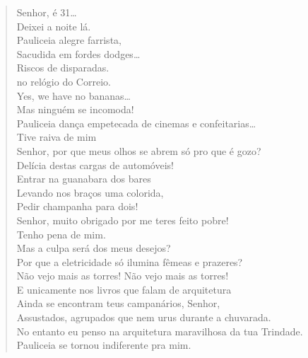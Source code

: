 {\begin{verse}
Senhor, é 31\ldots{}\\
Deixei a noite lá.\\
\qquad\quad Pauliceia alegre farrista,\\
\qquad\quad Sacudida em fordes dodges\ldots{}\\
\qquad\qquad\qquad\quad Riscos de disparadas.\\
\qquad{} no relógio do Correio.\\
\qquad\quad Yes, we have no bananas\ldots{}\\
\qquad Mas ninguém se incomoda!\\
\qquad Pauliceia dança empetecada de cinemas e confeitarias\ldots{}\\
Tive raiva de mim\\
Senhor, por que meus olhos se abrem só pro que é gozo?\\
Delícia destas cargas de automóveis!\\
Entrar na guanabara dos bares\\
Levando nos braços uma colorida,\\
Pedir champanha para dois!\\
Senhor, muito obrigado por me teres feito pobre!\\
Tenho pena de mim.\\
Mas a culpa será dos meus desejos?\\
Por que a eletricidade só ilumina fêmeas e prazeres?\\
Não vejo mais as torres! Não vejo mais as torres!\\
E unicamente nos livros que falam de arquitetura\\
Ainda se encontram teus campanários, Senhor,\\
Assustados, agrupados que nem urus durante a chuvarada.\\
No entanto eu penso na arquitetura maravilhosa da tua Trindade.\\
Pauliceia se tornou indiferente pra mim.


\end{verse}}
